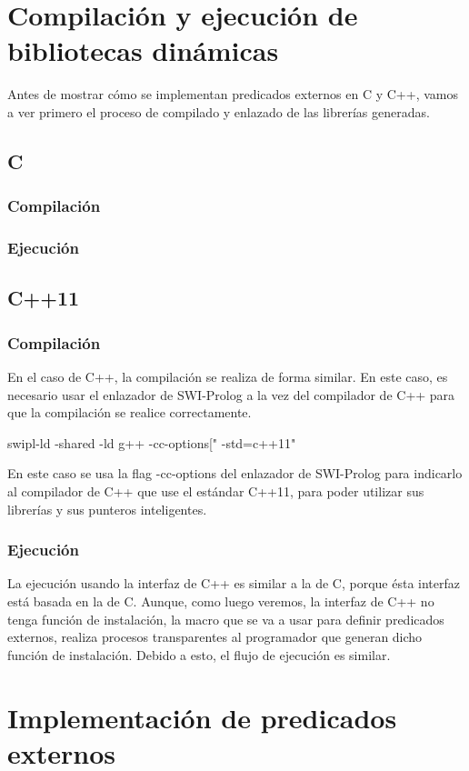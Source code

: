 \documentclass[a4paper,12pt]{article}
\begin{document}
\section{Compilación y ejecución de bibliotecas dinámicas}

Antes de mostrar cómo se implementan predicados externos en C y C++, vamos a ver primero el proceso de compilado y enlazado de las librerías generadas.
\subsection{C}
\subsubsection{Compilación}
\subsubsection{Ejecución}
\subsection{C++11}
\subsubsection{Compilación}
En el caso de C++, la compilación se realiza de forma similar. En este caso, es necesario usar el enlazador de SWI-Prolog a la vez del compilador de C++ para que la compilación se realice correctamente.

swipl-ld -shared -ld g++ -cc-options[" -std=c++11"

En este caso se usa la flag -cc-options del enlazador de SWI-Prolog para indicarlo al compilador de C++ que use el estándar C++11, para poder utilizar sus librerías y sus punteros inteligentes.
\subsubsection{Ejecución}
La ejecución usando la interfaz de C++ es similar a la de C, porque ésta interfaz está basada en la de C. Aunque, como luego veremos, la interfaz de C++ no tenga función de instalación, la macro que se va a usar para definir predicados externos, realiza procesos transparentes al programador que generan dicho función de instalación. Debido a esto, el flujo de ejecución es similar.


\section{Implementación de predicados externos}
\end{document}
